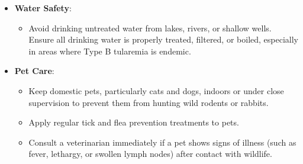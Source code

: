 \begin{itemize}
\begin{itemize}
    \end{itemize}
    \item \textbf{Water Safety}:
    \begin{itemize}
        \item Avoid drinking untreated water from lakes, rivers, or shallow wells. Ensure all drinking water is properly treated, filtered, or boiled, especially in areas where Type B tularemia is endemic.
    \end{itemize}
    \item \textbf{Pet Care}:
    \begin{itemize}
        \item Keep domestic pets, particularly cats and dogs, indoors or under close supervision to prevent them from hunting wild rodents or rabbits.
        \item Apply regular tick and flea prevention treatments to pets.
        \item Consult a veterinarian immediately if a pet shows signs of illness (such as fever, lethargy, or swollen lymph nodes) after contact with wildlife.
    \end{itemize}
\end{itemize}

